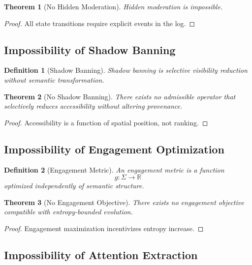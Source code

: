\documentclass[11pt]{article}
\newtheorem{definition}{Definition}
\newtheorem{theorem}{Theorem}
\begin{document}
\begin{theorem}[No Hidden Moderation]
Hidden moderation is impossible.
\end{theorem}

\begin{proof}
All state transitions require explicit events in the log.
\end{proof}

\subsection{Impossibility of Shadow Banning}

\begin{definition}[Shadow Banning]
Shadow banning is selective visibility reduction without semantic transformation.
\end{definition}

\begin{theorem}[No Shadow Banning]
There exists no admissible operator that selectively reduces accessibility without
altering provenance.
\end{theorem}

\begin{proof}
Accessibility is a function of spatial position, not ranking.
\end{proof}

\subsection{Impossibility of Engagement Optimization}

\begin{definition}[Engagement Metric]
An engagement metric is a function
\[
g : \Sigma \to \mathbb{R}
\]
optimized independently of semantic structure.
\end{definition}

\begin{theorem}[No Engagement Objective]
There exists no engagement objective compatible with entropy-bounded evolution.
\end{theorem}

\begin{proof}
Engagement maximization incentivizes entropy increase.
\end{proof}

\subsection{Impossibility of Attention Extraction}
\end{document}

